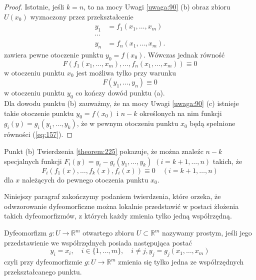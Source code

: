 \documentclass[leqno]{article}
\begin{document}
\begin{justify}
    \begin{proof}
        Istotnie, jeśli $k = n$, to na mocy Uwagi \ref{uwaga:90} (b) obraz zbioru $U(x_0)$ wyznaczony przez przekształcenie 
        \begin{equation}\label{eq:158}
            \begin{aligned}
                y_1 &= f_1(x_1, \ldots, x_m) \\
                \cdots \\ 
                y_n &= f_n(x_1, \ldots, x_m).
            \end{aligned}
        \end{equation}
        zawiera pewne otoczenie punktu $y_0 = f(x_0)$. Wówczas jednak równość 
        \[
            F(f_1(x_1, \ldots, x_m), \ldots, f_n(x_1, \ldots, x_m)) \equiv 0
        \]
        w otoczeniu punktu $x_0$ jest możliwa tylko przy warunku 
        \[
            F(y_1, \ldots, y_n) \equiv 0
        \]
        w otoczeniu punktu $y_0$ co kończy dowód punktu (a). \\
        Dla dowodu punktu (b) zauważmy, że na mocy Uwagi \ref{uwaga:90} (c) istnieje takie otoczenie punktu $y_0 = f(x_0)$ i $n-k$ określonych na nim 
        funkcji $g_i(y) = g_i(y_1, \ldots, y_k)$, że w pewnym otoczeniu punktu $x_0$ będą spełnione równości (\ref{eq:157}).
    \end{proof}

\begin{uwaga}
    Punkt (b) Twierdzenia \ref{theorem:225} pokazuje, że można znaleźc $n - k$ specjalnych funkcji 
    $F_i(y) = y_i - g_i(y_1, \ldots, y_k)$ $(i = k + 1, \ldots, n)$ takich, że 
    \[
        F_i(f_1(x), \ldots, f_k(x), f_i(x)) \equiv 0 \quad (i= k + 1, \ldots, n)
    \]
    dla $x$ należących do pewnego otoczenia punktu $x_0$.
\end{uwaga}

Niniejszy paragraf zakończymy podaniem twierdzenia, które orzeka, że odwzorowanie dyfeomorficzne można lokalnie przedstawić w postaci żłożenia takich dyfeomorfizmów, 
z których każdy zmienia tylko jedną współrzędną.

\begin{defn}
    Dyfeomorfizm $g : U \to \mathbb{R}^m$ otwartego zbioru $U \subset \mathbb{R}^m$ nazywamy prostym,
    jeśli jego przedstawienie we współrzędnych posiada następująca postać 
    \[
        y_i = x_i, \quad i \in \{1, \ldots, m\}, \quad i \neq j, y_j = g_j(x_1, \ldots, x_m)
    \]
    czyli przy dyfeomorfizmie $g : U \to \mathbb{R}^m$ zmienia się tylko jedna ze współrzędnych przekształcanego punktu.
\end{defn}


\end{justify}
\end{document}
